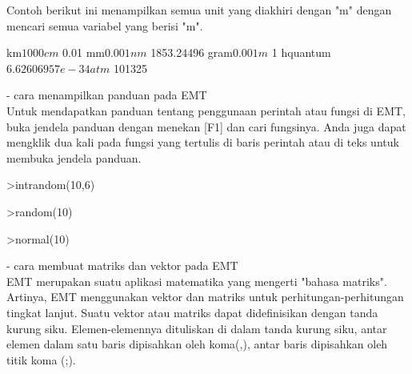 \documentclass[a4paper,10pt]{article}
\begin{document}
\begin{eulernotebook}
\begin{eulercomment}
\begin{eulercomment}
\begin{eulercomment}
Contoh berikut ini menampilkan semua unit yang diakhiri dengan "m"
dengan mencari semua variabel yang berisi "m\textdollar{}".
\end{eulercomment}
\begin{euleroutput}
  km$                 1000
  cm$                 0.01
  mm$                 0.001
  nm$                 1853.24496
  gram$               0.001
  m$                  1
  hquantum$           6.62606957e-34
  atm$                101325
\end{euleroutput}
\begin{eulercomment}
- cara menampilkan panduan pada EMT\\
Untuk mendapatkan panduan tentang penggunaan perintah atau fungsi di
EMT, buka jendela panduan dengan menekan [F1] dan cari fungsinya. Anda
juga dapat mengklik dua kali pada fungsi yang tertulis di baris
perintah atau di teks untuk membuka jendela panduan.

\end{eulercomment}
\begin{eulerprompt}
>intrandom(10,6)
\end{eulerprompt}
\begin{euleroutput}
  [4,  2,  6,  2,  4,  2,  3,  2,  2,  6]
\end{euleroutput}
\begin{eulerprompt}
>random(10)
\end{eulerprompt}
\begin{euleroutput}
  [0.270906,  0.704419,  0.217693,  0.445363,  0.308411,  0.914541,
  0.193585,  0.463387,  0.095153,  0.595017]
\end{euleroutput}
\begin{eulerprompt}
>normal(10)
\end{eulerprompt}
\begin{euleroutput}
  [-0.495418,  1.6463,  -0.390056,  -1.98151,  3.44132,  0.308178,
  -0.733427,  -0.526167,  1.10018,  0.108453]
\end{euleroutput}
\begin{eulercomment}
- cara membuat matriks dan vektor pada EMT\\
EMT merupakan suatu aplikasi matematika yang mengerti "bahasa
matriks". Artinya, EMT menggunakan vektor dan matriks untuk
perhitungan-perhitungan tingkat lanjut. Suatu vektor atau matriks
dapat didefinisikan dengan tanda kurung siku. Elemen-elemennya
dituliskan di dalam tanda kurung siku, antar elemen dalam satu baris
dipisahkan oleh koma(,), antar baris dipisahkan oleh titik koma (;).


\end{eulercomment}
\end{eulercomment}
\end{eulercomment}
\end{eulernotebook}
\end{document}
